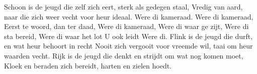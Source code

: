 \beginverse*
Schoon is de jeugd die zelf zich eert, sterk als gedegen staal,
Vredig van aard, naar die zich weer vecht voor heur ideaal.
Were di kameraad. Were di kameraad,
Eerst te woord, dan ter daad,
\endverse
\beginchorus
Were di kameraad,
Were di waar ge zijt,
Were di sta bereid,
Were di waar het lot U ook leidt
Were di.
\endchorus
\beginverse*
Flink is de jeugd die durft, en wat heur behoort in recht
Nooit zich vergooit voor vreemde wil, taai om heur waarden vecht.
\endverse
\beginverse*
Rijk is de jeugd die denkt en strijdt om wat nog komen moet,
Kloek en beraden zich bereidt, harten en zielen hoedt.
\endverse
\endsong